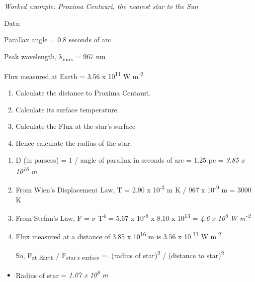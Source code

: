 \documentclass[revision-guide.tex]{subfiles}
\begin{document}
\begin{example}
\emph{Worked example: Proxima Centauri, the nearest star to the Sun}

Data:

Parallax angle = 0.8 seconds of arc

Peak wavelength, λ\textsubscript{max} = 967 nm

Flux measured at Earth = 3.56 x 10\textsuperscript{11} W
m\textsuperscript{-2}

\begin{enumerate}
\def\labelenumi{\arabic{enumi}.}
\item
  Calculate the distance to Proxima Centauri.
\item
  Calculate its surface temperature.
\item
  Calculate the Flux at the star's surface
\item
  Hence calculate the radius of the star.
\end{enumerate}

\answer

\begin{enumerate}
\def\labelenumi{\arabic{enumi}.}
\item
  D (in parsecs) = 1 / angle of parallax in seconds of arc = 1.25 pc =
  \emph{3.85 x 10\textsuperscript{16} m}
\item
  From Wien's Displacement Law, T = 2.90 x 10\textsuperscript{-3} m K /
  967 x 10\textsuperscript{-9} m = 3000 K
\item
  From Stefan's Law, F = $\sigma$ T\textsuperscript{4} = 5.67 x
  10\textsuperscript{-8} x 8.10 x 10\textsuperscript{13} = \emph{4.6 x
  10\textsuperscript{6} W m\textsuperscript{-2}}
\item
  Flux measured at a distance of 3.85 x 10\textsuperscript{16} m is 3.56
  x 10\textsuperscript{-11} W m\textsuperscript{-2}.

  So, F\textsubscript{at Earth} / F\textsubscript{star's surface} =.
  (radius of star)\textsuperscript{2} / (distance to
  star)\textsuperscript{2}
\end{enumerate}

\begin{itemize}
\item
  Radius of star = \emph{1.07 x 10\textsuperscript{8} m}
\end{itemize}

\end{example}

\end{document}

